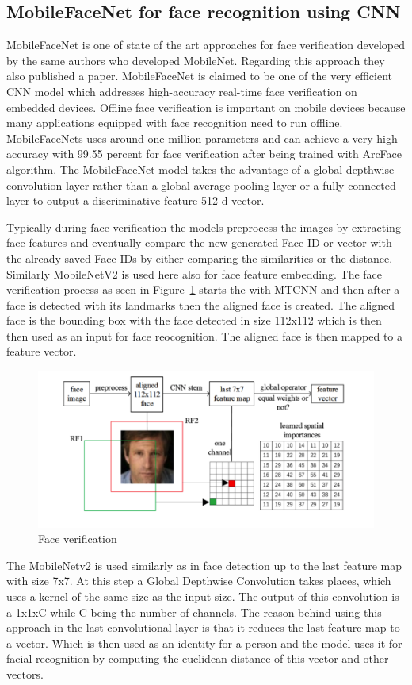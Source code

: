 \subsection{MobileFaceNet for face recognition using CNN}
MobileFaceNet is one of state of the art approaches for face verification developed by the same authors who developed MobileNet. Regarding this approach they also published a paper. MobileFaceNet is claimed to be one of the very efficient CNN model which addresses high-accuracy real-time face verification on embedded devices. Offline face verification is important on mobile devices because many applications equipped with face recognition need to run offline. 
MobileFaceNets uses around one million parameters and can achieve a very high accuracy with 99.55 percent for face verification after being trained with ArcFace algorithm. The MobileFaceNet model takes the advantage of a global
depthwise convolution layer rather than a global average pooling layer or a fully
connected layer to output a discriminative feature 512-d vector. 

Typically during face verification the models preprocess the images by extracting face features and eventually compare the new generated Face ID or vector with the already saved Face IDs by either comparing the similarities or the distance. Similarly MobileNetV2 is used here also for face feature embedding. The face verification process as seen in Figure~\ref{fig:face_ver} starts the with MTCNN and then after a face is detected with its landmarks then the aligned face is created. The aligned face is the bounding box with the face detected in size 112x112 which is then then used as an input for face reocognition. The aligned face is then mapped to a feature vector. 


\begin{figure}[!htb]
    \centering
    \includegraphics[width=1\textwidth]{figures/face_recognition.png}
    \caption{Face verification}
    \label{fig:face_ver}
\end{figure}

The MobileNetv2 is used similarly as in face detection up to the last feature map with size 7x7. At this step a Global Depthwise Convolution takes places, which uses a kernel of the same size as the input size. The output of this convolution is a 1x1xC while C being the number of channels. The reason behind using this approach in the last convolutional layer is that it reduces the last feature map to a vector. Which is then used as an identity for a person and the model uses it for facial recognition by computing the euclidean distance of this vector and other vectors. 
